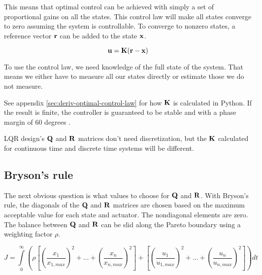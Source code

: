 This means that optimal control can be achieved with simply a set of
proportional gains on all the \glspl{state}. This \gls{control law} will make
all \glspl{state} converge to zero assuming the \gls{system} is controllable. To
converge to nonzero \glspl{state}, a \gls{reference} vector $\mathbf{r}$ can be
added to the \gls{state} $\mathbf{x}$.

\begin{theorem}
  \begin{equation}
    \mathbf{u} = \mathbf{K}(\mathbf{r} - \mathbf{x})
  \end{equation}
\end{theorem}

To use the \gls{control law}, we need knowledge of the full \gls{state} of the
\gls{system}. That means we either have to measure all our \glspl{state}
directly or estimate those we do not measure.

See appendix \ref{sec:deriv-optimal-control-law} for how $\mathbf{K}$ is calculated
in Python. If the result is finite, the controller is guaranteed to be stable
and  with a \gls{phase margin} of 60 degrees
\cite{bib:lqr-phase-margin}.

\begin{remark}
  LQR design's $\mathbf{Q}$ and $\mathbf{R}$ matrices don't need \gls{discretization},
  but the $\mathbf{K}$ calculated for continuous time and discrete time
  \glspl{system} will be different.
\end{remark}

\subsection{Bryson's rule}

The next obvious question is what values to choose for $\mathbf{Q}$ and $\mathbf{R}$.
With Bryson's rule, the diagonals of the $\mathbf{Q}$ and $\mathbf{R}$ matrices are
chosen based on the maximum acceptable value for each \gls{state} and actuator.
The nondiagonal elements are zero. The balance between $\mathbf{Q}$ and $\mathbf{R}$
can be slid along the Pareto boundary using a weighting factor $\rho$.

\begin{equation*}
  J = \int\limits_0^\infty \left(\rho \left[
    \left(\frac{x_1}{x_{1,max}}\right)^2 + \ldots +
    \left(\frac{x_n}{x_{n,max}}\right)^2\right] + \left[
    \left(\frac{u_1}{u_{1,max}}\right)^2 + \ldots +
    \left(\frac{u_n}{u_{n,max}}\right)^2\right]\right) dt
\end{equation*}

